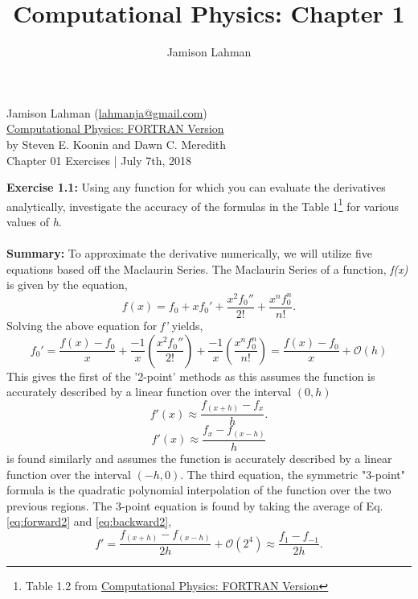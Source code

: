 \documentclass[10pt]{article}
\author{Jamison Lahman}
\title{Computational Physics: Chapter 1}
\begin{document}
\begin{flushright}Jamison Lahman (\href{mailto:lahmanja@gmail.com}{lahmanja@gmail.com}) \\
\href{https://www.amazon.com/Computational-Physics-Fortran-Steven-Koonin/dp/0201386232}{Computational Physics: FORTRAN Version} \\
by Steven E. Koonin and Dawn C. Meredith\\
Chapter 01 Exercises | July 7th, 2018 \\
\end{flushright}
\textbf{Exercise 1.1:} Using any function for which you can evaluate the derivatives analytically, investigate the accuracy of the formulas in the Table 1\footnote{Table 1.2 from \href{https://www.amazon.com/Computational-Physics-Fortran-Steven-Koonin/dp/0201386232}{Computational Physics: FORTRAN Version}} for various values of \textit{h}. \\
\\
\textbf{Summary:} To approximate the derivative numerically, we will utilize five equations based off the Maclaurin Series. The Maclaurin Series of a function, \textit{f(x)} is given by the equation,
\begin{equation}
f(x) = f_0 +x f_0'+ \frac{x^2f_0''}{2!} + \frac{x^nf_0^n}{n!}.
\end{equation}
Solving the above equation for \textit{f'} yields,
\begin{equation}
f_0' = \frac{f(x)-f_0}{x}+\frac{-1}{x}\left(\frac{x^2f_0''}{2!} \right)+ \frac{-1}{x} \left(\frac{x^nf_0^n}{n!}\right) =  \frac{f(x)-f_0}{x}  + \mathcal{O}(h)
\end{equation}
This gives the first of the '2-point' methods as this assumes the function is accurately described by a linear function over the interval $(0,h)$
\begin{equation}
\label{eq:forward2}
f'(x) \approx \frac{f_{(x+h)}-f_x}{h}.
\end{equation}
\begin{equation}
\label{eq:backward2}
f'(x) \approx \frac{f_{x}-f_{(x-h)}}{h}
\end{equation}
is found similarly and assumes the function is accurately described by a linear function over the interval $(-h,0)$. The third equation, the symmetric "3-point" formula is the quadratic polynomial interpolation of the function over the two previous regions. The 3-point equation is found by taking the average of Eq. \ref{eq:forward2} and \ref{eq:backward2},
\begin{equation}
\label{eq:symmetric3}
f'=\frac{f_{(x+h)}-f_{(x-h)}}{2h} + \mathcal{O}(2^4) \approx \frac{f_1-f_{-1}}{2h}.
\end{equation} 
\end{document}
